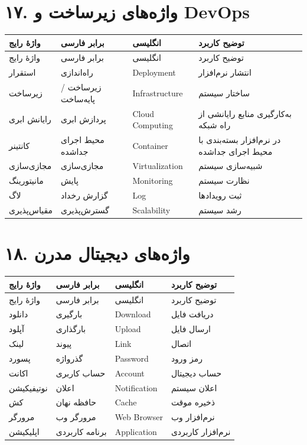 \documentclass[a4paper,12pt,openany]{book}
\begin{document}
\section*{۱۷. واژه‌های زیرساخت و DevOps}
\begingroup
\small
\setlength{\tabcolsep}{4pt}
\renewcommand{\arraystretch}{1.25}
\begin{longtable}{|p{2.5cm}|p{4.0cm}|p{2.3cm}|p{5.3cm}|}
\hline
واژهٔ رایج & برابر فارسی & انگلیسی & توضیح کاربرد \\
\hline
\endfirsthead
\hline
واژهٔ رایج & برابر فارسی & انگلیسی & توضیح کاربرد \\
\hline
\endhead
استقرار & راه‌اندازی & \textenglish{Deployment} & انتشار نرم‌افزار \\
زیرساخت & زیرساخت / پایه‌ساخت & \textenglish{Infrastructure} & ساختار سیستم \\
رایانش ابری & پردازش ابری & \textenglish{Cloud Computing} & به‌کارگیری منابع رایانشی از راه شبکه \\
کانتینر & محیط اجرای جداشده & \textenglish{Container} & در نرم‌افزار بسته‌بندی با محیط اجرای جداشده \\
مجازی‌سازی & مجازی‌سازی & \textenglish{Virtualization} & شبیه‌سازی سیستم \\
مانیتورینگ & پایش & \textenglish{Monitoring} & نظارت سیستم \\
لاگ & گزارش رخداد & \textenglish{Log} & ثبت رویدادها \\
مقیاس‌پذیری & گسترش‌پذیری & \textenglish{Scalability} & رشد سیستم \\
\hline
\end{longtable}
\endgroup

\section*{۱۸. واژه‌های دیجیتال مدرن}
\begingroup
\small
\setlength{\tabcolsep}{4pt}
\renewcommand{\arraystretch}{1.25}
\begin{longtable}{|p{2.5cm}|p{4.0cm}|p{2.3cm}|p{5.3cm}|}
\hline
واژهٔ رایج & برابر فارسی & انگلیسی & توضیح کاربرد \\
\hline
\endfirsthead
\hline
واژهٔ رایج & برابر فارسی & انگلیسی & توضیح کاربرد \\
\hline
\endhead
دانلود & بارگیری & \textenglish{Download} & دریافت فایل \\
آپلود & بارگذاری & \textenglish{Upload} & ارسال فایل \\
لینک & پیوند & \textenglish{Link} & اتصال \\
پسورد & گذرواژه & \textenglish{Password} & رمز ورود \\
اکانت & حساب کاربری & \textenglish{Account} & حساب دیجیتال \\
نوتیفیکیشن & اعلان & \textenglish{Notification} & اعلان سیستم \\
کش & حافظه نهان & \textenglish{Cache} & ذخیره موقت \\
مرورگر & مرورگر وب & \textenglish{Web Browser} & نرم‌افزار وب \\
اپلیکیشن & برنامه کاربردی & \textenglish{Application} & نرم‌افزار کاربردی \\
\hline
\end{longtable}
\endgroup


\end{document}
